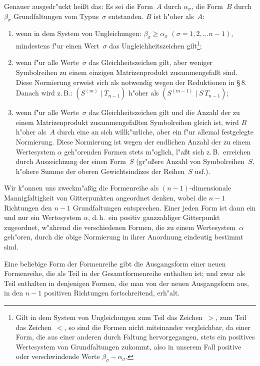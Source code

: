 \documentclass[11pt,a4paper]{article}
\begin{document}
Genauer ausgedr"{u}ckt hei\ss{}t das: Es sei die Form~$A$ durch $\alpha_{\sigma}$,
die Form~$B$ durch $\beta_{\sigma}$ Grundfaltungen vom Typus~$\sigma$ entstanden. $B$ ist
h"{o}her als~$A$:
\begin{enumerate}
\item wenn in dem System von Ungleichungen: $\beta_{\sigma}\ge\alpha_{\sigma}$ $(\sigma=1,2,\dots n-1)$,
mindestens f"{u}r einen Wert~$\sigma$ das Ungleichheitszeichen gilt\footnote{Gilt in dem System von Ungleichungen zum Teil das Zeichen~$>$, zum Teil das Zeichen~$<$, so sind die Formen nicht miteinander vergleichbar, da einer Form, die aus einer anderen durch Faltung hervorgegangen, stets ein positives Wertesystem von Grundfaltungen zukommt, also in unserem Fall positive oder verschwindende Werte $\beta_{\sigma}-\alpha_{\sigma}$.};
\item wenn f"{u}r alle Werte~$\sigma$ das Gleichheitszeichen gilt, aber weniger
Symbolreihen zu einem einzigen Matrizenprodukt zusammengefa\ss{}t sind.
Diese Normierung erweist sich als notwendig wegen der
Reduktionen in \S\,8. Danach wird z.\,B.: $(S^{(m)}\mid T_{n-1})$ h"{o}her als
$(S^{(m-1)}\mid S\,T_{n-1})$;
\item wenn f"{u}r alle Werte~$\sigma$ das Gleichheitszeichen gilt und die Anzahl
der zu einem Matrizenprodukt zusammengefa\ss{}ten Symbolreihen gleich
ist, wird $B$ h"{o}her als~$A$ durch eine an sich willk"{u}rliche, aber ein
f"{u}r allemal festgelegte Normierung. Diese Normierung ist wegen der
endlichen Anzahl der zu einem Wertesystem $\alpha$ geh"{o}renden Formen
stets m"{o}glich, l"{a}\ss{}t sich z.\,B.\ erreichen durch Auszeichnung der
einen Form~$S$ (gr"{o}\ss{}ere Anzahl von Symbolreihen~$S$, h"{o}here Summe
der oberen Gewichtsindizes der Reihen~$S$ usf.).
\end{enumerate}

\smallskip
\noindent
Wir k"{o}nnen uns zweckm"{a}\ss{}ig die Formenreihe als $(n-1)$-dimensionale
Mannigfaltigkeit von Gitterpunkten angeordnet denken, wobei die $n-1$
Richtungen den $n-1$ Grundfaltungen entsprechen. Einer jeden Form ist
dann ein und nur ein Wertesystem $\alpha$, d.\,h.\ ein positiv ganzzahliger
Gitterpunkt zugeordnet, w"{a}hrend die verschiedenen Formen, die zu einem
Wertesystem~$\alpha$ geh"{o}ren, durch die obige Normierung in ihrer Anordnung
eindeutig bestimmt sind.

Eine beliebige Form der Formenreihe gibt die Ausgangsform einer
neuen Formenreihe, die als Teil in der Gesamtformenreihe enthalten ist;
und zwar als Teil enthalten in denjenigen Formen, die man von der neuen
Ausgangsform aus, in den $n-1$ positiven Richtungen fortschreitend, erh"{a}lt.
\end{document}
